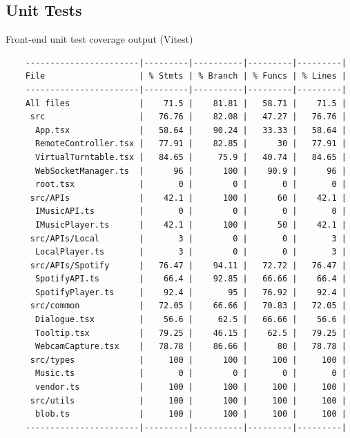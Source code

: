 \begin{uomappendix}
            \subsection{Unit Tests}
                \begin{table}[H]
                    \centering
                    \caption{Front-end unit test coverage output (Vitest)}
                    \begin{verbatim}
    -----------------------|---------|----------|---------|---------|
    File                   | % Stmts | % Branch | % Funcs | % Lines |
    -----------------------|---------|----------|---------|---------|
    All files              |    71.5 |    81.81 |   58.71 |    71.5 |
     src                   |   76.76 |    82.08 |   47.27 |   76.76 |
      App.tsx              |   58.64 |    90.24 |   33.33 |   58.64 |
      RemoteController.tsx |   77.91 |    82.85 |      30 |   77.91 |
      VirtualTurntable.tsx |   84.65 |     75.9 |   40.74 |   84.65 |
      WebSocketManager.ts  |      96 |      100 |    90.9 |      96 |
      root.tsx             |       0 |        0 |       0 |       0 |
     src/APIs              |    42.1 |      100 |      60 |    42.1 |
      IMusicAPI.ts         |       0 |        0 |       0 |       0 |
      IMusicPlayer.ts      |    42.1 |      100 |      50 |    42.1 |
     src/APIs/Local        |       3 |        0 |       0 |       3 |
      LocalPlayer.ts       |       3 |        0 |       0 |       3 |
     src/APIs/Spotify      |   76.47 |    94.11 |   72.72 |   76.47 |
      SpotifyAPI.ts        |    66.4 |    92.85 |   66.66 |    66.4 |
      SpotifyPlayer.ts     |    92.4 |       95 |   76.92 |    92.4 |
     src/common            |   72.05 |    66.66 |   70.83 |   72.05 |
      Dialogue.tsx         |    56.6 |     62.5 |   66.66 |    56.6 |
      Tooltip.tsx          |   79.25 |    46.15 |    62.5 |   79.25 |
      WebcamCapture.tsx    |   78.78 |    86.66 |      80 |   78.78 |
     src/types             |     100 |      100 |     100 |     100 |
      Music.ts             |       0 |        0 |       0 |       0 |
      vendor.ts            |     100 |      100 |     100 |     100 |
     src/utils             |     100 |      100 |     100 |     100 |
      blob.ts              |     100 |      100 |     100 |     100 |
    -----------------------|---------|----------|---------|---------|
                    \end{verbatim}
                \end{table}
    

\end{uomappendix}
